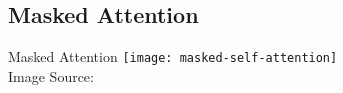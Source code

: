 \subsection{Masked Attention}
\begin{frame}[c]{Masked Attention}
    \texttt{[image: masked-self-attention]} \\
    Image Source: \cite{alammar_illustrated_2019}
\end{frame}


